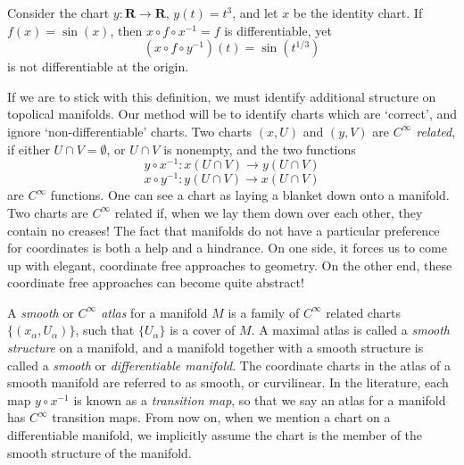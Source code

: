 \begin{example}
    Consider the chart $y: \mathbf{R} \to \mathbf{R}$, $y(t) = t^3$, and let $x$ be the identity chart. If $f(x) = \sin(x)$, then $x \circ f \circ x^{-1} = f$ is differentiable, yet
    \[ (x \circ f \circ y^{-1})(t) = \sin( t^{1/3} ) \]
    is not differentiable at the origin.
\end{example}

If we are to stick with this definition, we must identify additional structure on topolical manifolds. Our method will be to identify charts which are `correct', and ignore `non-differentiable' charts. Two charts $(x,U)$ and $(y,V)$ are \emph{$C^\infty$ related}, if either $U \cap V = \emptyset$, or $U \cap V$ is nonempty, and the two functions
%
\[ y \circ x^{-1} : x(U \cap V) \to y(U \cap V) \]
%
\[ x \circ y^{-1} : y(U \cap V) \to x(U \cap V) \]
%
are $C^\infty$ functions. One can see a chart as laying a blanket down onto a manifold. Two charts are $C^\infty$ related if, when we lay them down over each other, they contain no creases! The fact that manifolds do not have a particular preference for coordinates is both a help and a hindrance. On one side, it forces us to come up with elegant, coordinate free approaches to geometry. On the other end, these coordinate free approaches can become quite abstract!

A \emph{smooth} or \emph{$C^\infty$ atlas} for a manifold $M$ is a family of $C^\infty$ related charts $\{ (x_\alpha, U_\alpha) \}$, such that $\{ U_\alpha \}$ is a cover of $M$. A maximal atlas is called a \emph{smooth structure} on a manifold, and a manifold together with a smooth structure is called a \emph{smooth} or \emph{differentiable manifold}. The coordinate charts in the atlas of a smooth manifold are referred to as smooth, or curvilinear. In the literature, each map $y \circ x^{-1}$ is known as a \emph{transition map}, so that we say an atlas for a manifold has $C^\infty$ transition maps. From now on, when we mention a chart on a differentiable manifold, we implicitly assume the chart is the member of the smooth structure of the manifold.

